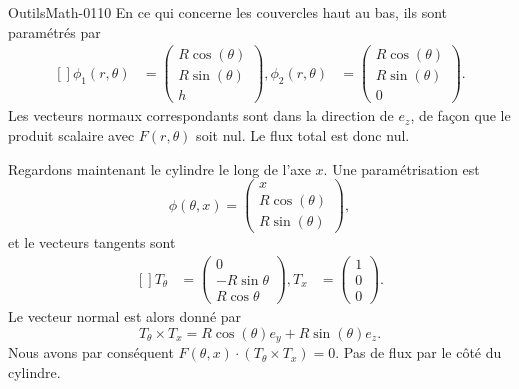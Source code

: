 \begin{corrige}{OutilsMath-0110}
    En ce qui concerne les couvercles haut au bas, ils sont paramétrés par
    \begin{equation}
        \begin{aligned}[]
            \phi_1(r,\theta)&=\begin{pmatrix}
                R\cos(\theta)    \\ 
                R\sin(\theta)    \\ 
                h    
            \end{pmatrix},
            \phi_2(r,\theta)&=\begin{pmatrix}
                R\cos(\theta)    \\ 
                R\sin(\theta)    \\ 
                0    
            \end{pmatrix}.
        \end{aligned}
    \end{equation}
    Les vecteurs normaux correspondants sont dans la direction de $e_z$, de façon que le produit scalaire avec $F(r,\theta)$ soit nul. Le flux total est donc nul.

    Regardons maintenant le cylindre le long de l'axe $x$. Une paramétrisation est
    \begin{equation}
        \phi(\theta,x)=\begin{pmatrix}
            x    \\ 
            R\cos(\theta)    \\ 
            R\sin(\theta)    
        \end{pmatrix},
    \end{equation}
    et le vecteurs tangents sont
    \begin{equation}
        \begin{aligned}[]
            T_{\theta}&=\begin{pmatrix}
                0    \\ 
                -R\sin\theta    \\ 
                R\cos\theta    
            \end{pmatrix},
            T_x&=\begin{pmatrix}
                1    \\ 
                0    \\ 
                0    
            \end{pmatrix}.
        \end{aligned}
    \end{equation}
    Le vecteur normal est alors donné par
    \begin{equation}
        T_{\theta}\times T_x=R\cos(\theta)e_y+R\sin(\theta)e_z.
    \end{equation}
    Nous avons par conséquent $F(\theta,x)\cdot (T_{\theta}\times T_x)=0$. Pas de flux par le côté du cylindre.


\end{corrige}
